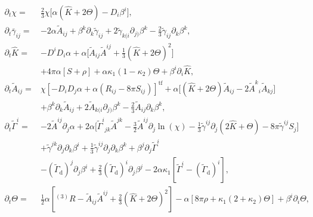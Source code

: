 \begin{equation}
    \begin{aligned}
    \partial_t\chi =& \frac{2}{3}\chi \Big[ \alpha (\hat{K} + 2\Theta) - D_i\beta^i \Big], \\
    \partial_t\bar{\gamma}_{ij} =& -2\alpha\widetilde{A}_{ij} + \beta^k\partial_k\widetilde{\gamma}_{ij} + 
    2\widetilde{\gamma}_{k(i}\partial_{j)}\beta^k - \frac{2}{3}\widetilde{\gamma}_{ij}\partial_k\beta^k, \\
    \partial_t\hat{K} =& -D^{i}D_{i}\alpha + \alpha \Big[ \widetilde{A}_{ij}\widetilde{A}^{ij} + \frac{1}{3}(\hat{K} + 2\Theta)^2 \Big]  \\
    & + 4\pi \alpha [S + \rho] + \alpha \kappa_1 (1 - \kappa_2)\Theta + \beta^i\partial_i\hat{K},  \\
    \partial_t\widetilde{A}_{ij} =& \chi [ -D_i D_j \alpha + \alpha(R_{ij} - 8\pi S_{ij}) ]^{\text{tf}} + 
    \alpha \Big[ (\hat{K} + 2\Theta)\widetilde{A}_{ij} - 2 {\widetilde{A}^k}_i\widetilde{A}_{kj} \Big] \\
    & + \beta^k\partial_k\widetilde{A}_{ij} + 2\widetilde{A}_{k(i}\partial_{j)}\beta^k - \frac{2}{3}\widetilde{A}_{ij}\partial_{k}\beta^{k},  \\
    \partial_t\widetilde{\Gamma}^i =& -2\widetilde{A}^{ij}\partial_j\alpha + 2\alpha\Big[ {\widetilde{\Gamma}^i}_{jk}\widetilde{A}^{jk} - 
    \frac{3}{2}\widetilde{A}^{ij}\partial_j\ln(\chi) - \frac{1}{3}\widetilde{\gamma}^{ij}\partial_j(2\hat{K}+\Theta) - 8\pi\widetilde{\gamma}^{ij}S_j \Big] \\
    & + \widetilde{\gamma}^{jk}\partial_j\partial_k\beta^i + \frac{1}{3}\widetilde{\gamma}^{ij}\partial_j\partial_k\beta^k + \beta^j\partial_j\widetilde{\Gamma}^i \\
    & - (\widetilde{\Gamma}_{\text{d}})^j\partial_j\beta^i + \frac{2}{3}(\widetilde{\Gamma}_{\text{d}})^i\partial_j\beta^j - 
    2\alpha\kappa_1 [ \widetilde{\Gamma}^i - (\widetilde{\Gamma}_{\text{d}})^i ], \\
    \partial_t\Theta =& \frac{1}{2}\alpha [{^{(3)}R} - \widetilde{A}_{ij}\widetilde{A}^{ij} + \frac{2}{3}(\hat{K} + 2\Theta)^2] - 
    \alpha [ 8\pi\rho + \kappa_1(2+\kappa_2)\Theta ] + \beta^i\partial_i\Theta, 
    \end{aligned}
    \label{eq:theory:z4c_equations} %
\end{equation}

